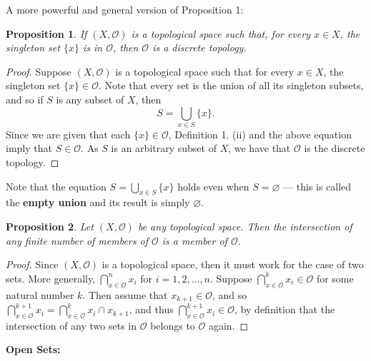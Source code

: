 \documentclass[12pt,reqno]{amsart}
\theoremstyle{plain}
\newtheorem{prop}{Proposition}
\newcommand{\oo}{\mathcal{O}}
\begin{document}
A more powerful and general version of Proposition 1:
\begin{prop} If $(X, \mathcal{O})$ is a topological space such that, for every $x \in X$, the singleton set $\{x \}$ is in $\mathcal{O}$, then $\mathcal{O}$ is a discrete topology.
\end{prop} 
\begin{proof} Suppose $(X, \mathcal{O})$ is a topological space such that for every $x \in X$, the singleton set $\{ x \} \in \mathcal{O}$. Note that every set is the union of all its singleton subsets, and so if $S$ is any subset of $X$, then $$S = \bigcup_{x \in S} \{x \}.$$ Since we are given that each $\{ x \} \in \mathcal{O}$, Definition 1. (ii) and the above equation imply that $S \in \mathcal{O}$. As $S$ is an arbitrary subset of $X$, we have that $\mathcal{O}$ is the discrete topology.
\end{proof}

Note that the equation $S = \bigcup_{x \in S} \{ x \}$ holds even when $S = \varnothing$ — this is called the \textbf{empty union} and its result is simply $\varnothing$. 
\begin{prop} Let $(X, \oo)$ be any topological space. Then the intersection of any finite number of members of $\oo$ is a member of $\oo$. 
\end{prop} 
\begin{proof} Since $(X, \oo)$ is a topological space, then it must work for the case of two sets. More generally, $\bigcap_{x \in \oo}^n x_i$ for $i = 1, 2, \ldots, n$. Suppose $\bigcap_{x \in \oo}^k x_i \in \oo $ for some natural number $k$. Then assume that $x_{k+1} \in \oo$, and so $\bigcap_{x \in \oo}^{k+1} x_i = \bigcap_{x \in \oo}^k x_i \cap x_{k+1}$, and thus $\bigcap_{x \in \oo}^{k+1} x_i \in \oo$, by definition that the intersection of any two sets in $\oo$ belongs to $\oo$ again.
\end{proof}
\bigskip

\; \; \textbf{Open Sets:}
\end{document}
